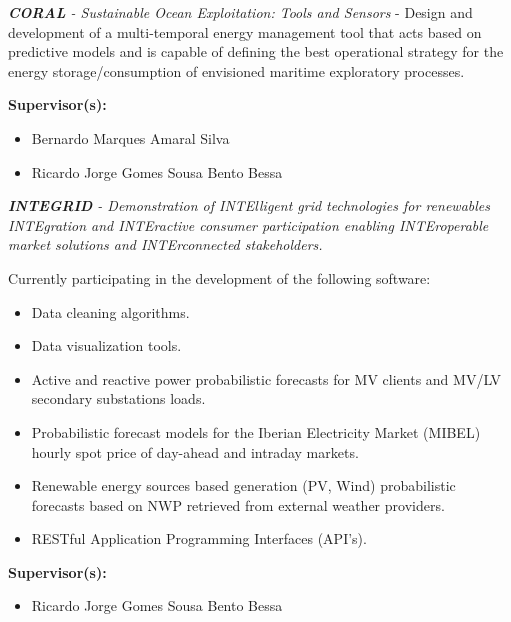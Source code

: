 \documentclass{mycv}
\begin{document}
\begin{myitemize}
	\item \textit{\textbf{CORAL} - Sustainable Ocean Exploitation: Tools and Sensors}
	 - Design and development of a multi-temporal energy management tool that acts based on predictive models and is capable of defining the best operational strategy for the energy storage/consumption of envisioned maritime exploratory processes.
	
	\vspace{0.2cm}
	
	\textbf{Supervisor(s):}
	\begin{itemize}
		\item Bernardo Marques Amaral Silva
		\item Ricardo Jorge Gomes Sousa Bento Bessa
	\end{itemize}
		
	\vspace{0.4cm}
	
	\item \textit{\textbf{INTEGRID} - Demonstration of INTElligent grid technologies for renewables INTEgration and INTEractive consumer participation enabling INTEroperable market solutions and INTErconnected stakeholders.}
	
	\vspace{0.2cm}
	
	Currently participating in the development of the following software:
	\begin{itemize}[itemsep=1px]
		\item Data cleaning algorithms.
		\item Data visualization tools.
		\item Active and reactive power probabilistic forecasts for MV clients and MV/LV secondary substations loads.
		\item Probabilistic forecast models for the Iberian Electricity Market (MIBEL) hourly spot price of day-ahead and intraday markets.
		\item Renewable energy sources based generation (PV, Wind) probabilistic forecasts based on NWP  retrieved from external weather providers.
		\item RESTful Application Programming Interfaces (API's).
	\end{itemize}
	
	
	
	
	\vspace{0.2cm}
	
	\textbf{Supervisor(s):}
	\begin{itemize}
		\item Ricardo Jorge Gomes Sousa Bento Bessa
	\end{itemize}
	
	
	
\end{myitemize}
\end{document}
